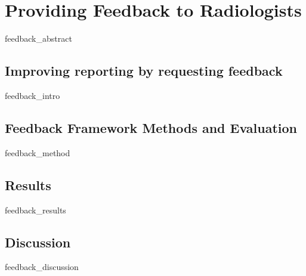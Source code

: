 \chapter{Providing Feedback to Radiologists}
{feedback_abstract}
\clearpage

\section{Improving reporting by requesting feedback}
{feedback_intro}
\clearpage

\section{Feedback Framework Methods and Evaluation}
{feedback_method}
\clearpage

\section{Results}
{feedback_results}
\clearpage

\section{Discussion}
{feedback_discussion}